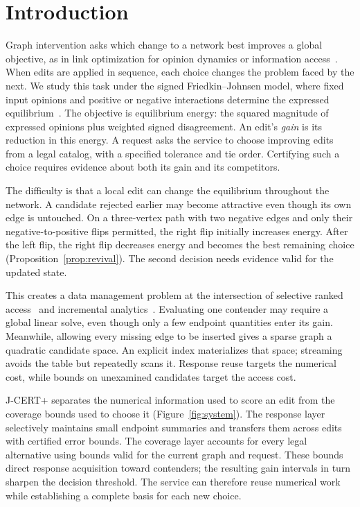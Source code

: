 \section{Introduction}
\label{sec:introduction}

Graph intervention asks which change to a network best improves a global objective, as in link optimization for opinion dynamics or information access~\cite{zhu2021polarization,liu2026accessfairness}. When edits are applied in sequence, each choice changes the problem faced by the next. We study this task under the signed Friedkin--Johnsen model, where fixed input opinions and positive or negative interactions determine the expressed equilibrium~\cite{friedkin1990opinions,zhou2024signedfj}. The objective is equilibrium energy: the squared magnitude of expressed opinions plus weighted signed disagreement. An edit's \emph{gain} is its reduction in this energy. A request asks the service to choose improving edits from a legal catalog, with a specified tolerance and tie order. Certifying such a choice requires evidence about both its gain and its competitors.

The difficulty is that a local edit can change the equilibrium throughout the network. A candidate rejected earlier may become attractive even though its own edge is untouched. On a three-vertex path with two negative edges and only their negative-to-positive flips permitted, the right flip initially increases energy. After the left flip, the right flip decreases energy and becomes the best remaining choice (Proposition~\ref{prop:revival}). The second decision needs evidence valid for the updated state.

This creates a data management problem at the intersection of selective ranked access~\cite{bruno2002webtopk,guo2008querydependent} and incremental analytics~\cite{Koch_2014,Nikolic2014Linview}. Evaluating one contender may require a global linear solve, even though only a few endpoint quantities enter its gain. Meanwhile, allowing every missing edge to be inserted gives a sparse graph a quadratic candidate space. An explicit index materializes that space; streaming avoids the table but repeatedly scans it. Response reuse targets the numerical cost, while bounds on unexamined candidates target the access cost.

J-CERT+ separates the numerical information used to score an edit from the coverage bounds used to choose it (Figure~\ref{fig:system}). The response layer selectively maintains small endpoint summaries and transfers them across edits with certified error bounds. The coverage layer accounts for every legal alternative using bounds valid for the current graph and request. These bounds direct response acquisition toward contenders; the resulting gain intervals in turn sharpen the decision threshold. The service can therefore reuse numerical work while establishing a complete basis for each new choice.

